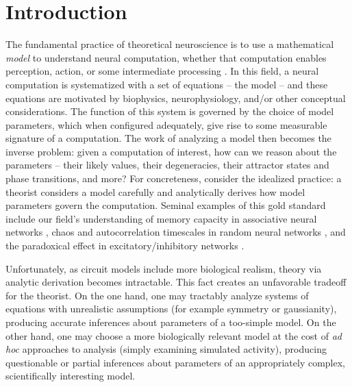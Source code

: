 \documentclass[11pt]{article}
\begin{document}
\section{Introduction}

The fundamental practice of theoretical neuroscience is to use a mathematical \emph{model} to understand neural computation, whether that computation enables perception, action, or some intermediate processing \cite{abbott2008theoretical}.  
In this field, a neural computation is systematized with a set of equations -- the model -- and these equations are motivated by biophysics, neurophysiology, and/or other conceptual considerations.
The function of this system is governed by the choice of model parameters, which when configured adequately, give rise to some measurable signature of a computation.   
The work of analyzing a model then becomes the inverse problem: given a computation of interest, how can we reason about the parameters -- their likely values, their degeneracies, their attractor states and phase transitions, and more?  
For concreteness, consider the idealized practice: a theorist considers a model carefully and analytically derives how model parameters govern the computation.  
Seminal examples of this gold standard include our field's understanding of memory capacity in associative neural networks \cite{hopfield1984neurons}, chaos and autocorrelation timescales in random neural networks \cite{sompolinsky1988chaos}, and the paradoxical effect in excitatory/inhibitory networks \cite{tsodyks1997paradoxical}.  

Unfortunately, as circuit models include more biological realism, theory via analytic derivation becomes intractable.  
This fact creates an unfavorable tradeoff for the theorist.  On the one hand, one may tractably analyze systems of equations with unrealistic assumptions (for example symmetry or gaussianity), producing accurate inferences about parameters of a too-simple model.  On the other hand, one may choose a more biologically relevant model at the cost of \emph{ad hoc} approaches to analysis (simply examining simulated activity), producing questionable or partial inferences about parameters of an appropriately complex, scientifically interesting model.  %
\end{document}
